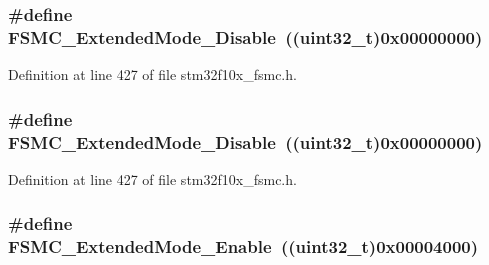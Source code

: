 \subsubsection[{\texorpdfstring{F\+S\+M\+C\+\_\+\+Extended\+Mode\+\_\+\+Disable}{FSMC_ExtendedMode_Disable}}]{\setlength{\rightskip}{0pt plus 5cm}\#define F\+S\+M\+C\+\_\+\+Extended\+Mode\+\_\+\+Disable~(({\bf uint32\+\_\+t})0x00000000)}\hypertarget{group___f_s_m_c___extended___mode_ga5a1f1acdc44328158f59012748980dd3}{}\label{group___f_s_m_c___extended___mode_ga5a1f1acdc44328158f59012748980dd3}


Definition at line 427 of file stm32f10x\+\_\+fsmc.\+h.

\subsubsection[{\texorpdfstring{F\+S\+M\+C\+\_\+\+Extended\+Mode\+\_\+\+Disable}{FSMC_ExtendedMode_Disable}}]{\setlength{\rightskip}{0pt plus 5cm}\#define F\+S\+M\+C\+\_\+\+Extended\+Mode\+\_\+\+Disable~(({\bf uint32\+\_\+t})0x00000000)}\hypertarget{group___f_s_m_c___extended___mode_ga5a1f1acdc44328158f59012748980dd3}{}\label{group___f_s_m_c___extended___mode_ga5a1f1acdc44328158f59012748980dd3}


Definition at line 427 of file stm32f10x\+\_\+fsmc.\+h.

\subsubsection[{\texorpdfstring{F\+S\+M\+C\+\_\+\+Extended\+Mode\+\_\+\+Enable}{FSMC_ExtendedMode_Enable}}]{\setlength{\rightskip}{0pt plus 5cm}\#define F\+S\+M\+C\+\_\+\+Extended\+Mode\+\_\+\+Enable~(({\bf uint32\+\_\+t})0x00004000)}\hypertarget{group___f_s_m_c___extended___mode_gaef9ff4c81a52fdb0471d2c4422271d2a}{}\label{group___f_s_m_c___extended___mode_gaef9ff4c81a52fdb0471d2c4422271d2a}


